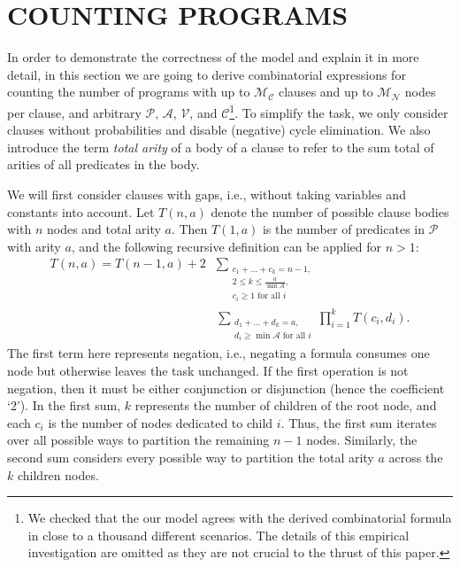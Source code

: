 \documentclass[letterpaper]{article}
\theoremstyle{definition}
\newcommand{\predicates}{\mathcal{P}}
\newcommand{\variables}{\mathcal{V}}
\newcommand{\constants}{\mathcal{C}}
\newcommand{\arities}{\mathcal{A}}
\newcommand{\maxNumNodes}{\mathcal{M}_{\mathcal{N}}}
\newcommand{\maxNumClauses}{\mathcal{M}_{\mathcal{C}}}
\begin{document}
\section{COUNTING PROGRAMS} \label{sec:counting}

In order to demonstrate the correctness of the model and explain it in more
detail, in this section we are going to derive combinatorial expressions for
counting the number of programs with up to $\maxNumClauses{}$ clauses and up to
$\maxNumNodes{}$ nodes per clause, and arbitrary $\predicates{}$,
$\arities{}$, $\variables{}$, and $\constants{}$\footnote{We checked that the
  our model agrees with the derived combinatorial formula in close to a thousand
  different scenarios. The details of this empirical investigation are omitted
  as they are not crucial to the thrust of this paper.}. To simplify the task,
we only consider clauses without probabilities and disable (negative) cycle
elimination. We also introduce the term \emph{total arity} of a body of a clause
to refer to the sum total of arities of all predicates in the body.

We will first consider clauses with gaps, i.e., without taking variables and
constants into account. Let $T(n, a)$ denote the number of possible clause
bodies with $n$ nodes and total arity $a$. Then $T(1, a)$ is the number of
predicates in $\predicates{}$ with arity $a$, and the following recursive
definition can be applied for $n > 1$:
\begin{align*}
  T(n, a) = T(n-1, a) + 2&\sum_{\substack{c_1 + \dots + c_k = n - 1,\\
      2 \le k \le \frac{a}{\min \arities{}},\\
  c_i \ge 1 \text{ for all } i}}\\
  &\sum_{\substack{d_1 + \dots + d_k = a,\\
  d_i \ge \min \arities{} \text{ for all } i}} \prod_{i=1}^k T(c_i, d_i).
\end{align*}
The first term here represents negation, i.e., negating a formula consumes
one node but otherwise leaves the task unchanged. If the first operation is not
negation, then it must be either conjunction or disjunction (hence the
coefficient `2'). In the first sum, $k$ represents the number of children of the
root node, and each $c_i$ is the number of nodes dedicated to child $i$. Thus,
the first sum iterates over all possible ways to partition the remaining $n-1$
nodes. Similarly, the second sum considers every possible way to partition the
total arity $a$ across the $k$ children nodes.
\end{document}
